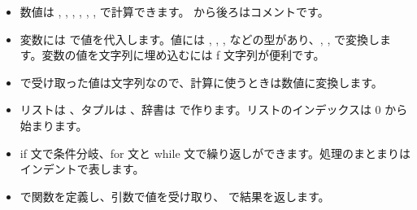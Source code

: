 \begin{itemize}
  \item 数値は \cmd{+}, \cmd{-}, \cmd{*}, \cmd{/}, \cmd{**}, \cmd{//}, \cmd{\%} で計算できます。\cmd{\#} から後ろはコメントです。
  \item 変数には \cmd{=} で値を代入します。値には , , ,  などの型があり、, ,  で変換します。変数の値を文字列に埋め込むには f 文字列が便利です。
  \item {} で受け取った値は文字列なので、計算に使うときは数値に変換します。
  \item リストは \cmd{[ ]}、タプルは \cmd{( )}、辞書は \cmd{\{ \}} で作ります。リストのインデックスは 0 から始まります。
  \item if 文で条件分岐、for 文と while 文で繰り返しができます。処理のまとまりはインデントで表します。
  \item {} で関数を定義し、引数で値を受け取り、 で結果を返します。
\end{itemize}
